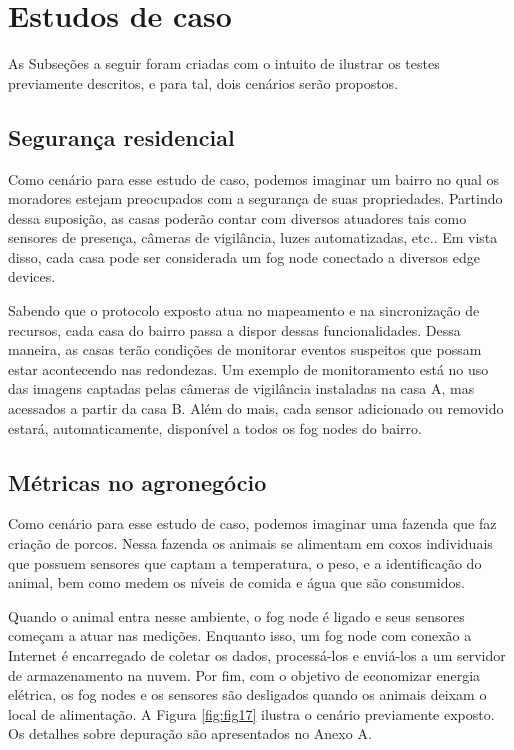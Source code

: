 \section{Estudos de caso}

As Subseções a seguir foram criadas com o intuito de ilustrar os testes previamente descritos, e para tal, dois cenários serão propostos.

\subsection{Segurança residencial}

Como cenário para esse estudo de caso, podemos imaginar um bairro no qual os moradores estejam preocupados com a segurança de suas propriedades.
Partindo dessa suposição, as casas poderão contar com diversos atuadores tais como sensores de presença, câmeras de vigilância, luzes automatizadas, etc..
Em vista disso, cada casa pode ser considerada um fog node conectado a diversos edge devices.

Sabendo que o protocolo exposto atua no mapeamento e na sincronização de recursos, cada casa do bairro passa a dispor dessas funcionalidades.
Dessa maneira, as casas terão condições de monitorar eventos suspeitos que possam estar acontecendo nas redondezas.
Um exemplo de monitoramento está no uso das imagens captadas pelas câmeras de vigilância instaladas na casa A, mas acessados a partir da casa B.
Além do mais, cada sensor adicionado ou removido estará, automaticamente, disponível a todos os fog nodes do bairro.


\subsection{Métricas no agronegócio}


Como cenário para esse estudo de caso, podemos imaginar uma fazenda que faz criação de porcos.
Nessa fazenda os animais se alimentam em coxos individuais que possuem sensores que captam a temperatura, o peso, e a identificação do animal, bem como medem os níveis de comida e água
que são consumidos.

Quando o animal entra nesse ambiente, o fog node é ligado e seus sensores começam a atuar nas medições.
Enquanto isso, um fog node com conexão a Internet é encarregado de coletar os dados, processá-los e enviá-los a um servidor de armazenamento na nuvem.
Por fim, com o objetivo de economizar energia elétrica, os fog nodes e os sensores são desligados quando os animais deixam o local de alimentação.
A Figura \ref{fig:fig17} ilustra o cenário previamente exposto. Os detalhes sobre depuração são apresentados no Anexo A.


